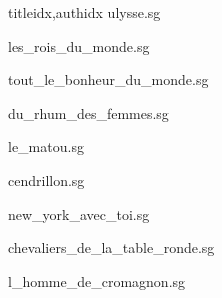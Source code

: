 \documentclass[12pt]{article}
\begin{document}
\begin{songs}{titleidx,authidx}
{ulysse.sg}


{les_rois_du_monde.sg}


{tout_le_bonheur_du_monde.sg}


{du_rhum_des_femmes.sg}


{le_matou.sg}


{cendrillon.sg}


{new_york_avec_toi.sg}


{chevaliers_de_la_table_ronde.sg}


{l_homme_de_cromagnon.sg}



\end{songs}
\end{document}
